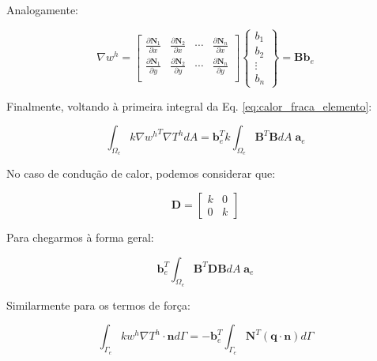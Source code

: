         Analogamente:

        \begin{equation*}
            \nabla w^h =  
            \begin{bmatrix}
                \frac{\partial \mathbf{N}_1}{\partial x} & \frac{\partial \mathbf{N}_2}{\partial x} & \cdots & \frac{\partial \mathbf{N}_n}{\partial x}\\
                \frac{\partial \mathbf{N}_1}{\partial y} & \frac{\partial \mathbf{N}_2}{\partial y} & \cdots & \frac{\partial \mathbf{N}_n}{\partial y}\\
            \end{bmatrix}
            \begin{Bmatrix}
                b_1\\
                b_2\\
                \vdots\\
                b_n
            \end{Bmatrix}
            = 
            \mathbf{B}
            \mathbf{b}_e
        \end{equation*}
        
        Finalmente, voltando à primeira integral da Eq. \eqref{eq:calor_fraca_elemento}:

        \begin{equation*}
            \int_{\Omega_e} k \nabla {w^h}^T \nabla T^h  dA = \mathbf{b}_e^T  k\int_{\Omega_e} \mathbf{B}^T \mathbf{B} dA \;\mathbf{a}_e
        \end{equation*}

        No caso de condução de calor, podemos considerar que:

        \begin{equation}
            \mathbf{D} = 
            \begin{bmatrix}
                k & 0\\
                0 & k
            \end{bmatrix}
        \end{equation}

        Para chegarmos à forma geral:

        \begin{equation*}
            \mathbf{b}_e^T  \int_{\Omega_e} \mathbf{B}^T \mathbf{D} \mathbf{B} dA \; \mathbf{a}_e
        \end{equation*}

        Similarmente para os termos de força:

        \begin{equation}
            \int_{\Gamma_e} k w^h\nabla T^h \cdot \mathbf{n} d\Gamma = -
            \mathbf{b}_e^T  \int_{\Gamma_e} \mathbf{N}^T \left(\mathbf{q} \cdot \mathbf{n}\right) d\Gamma
        \end{equation}

